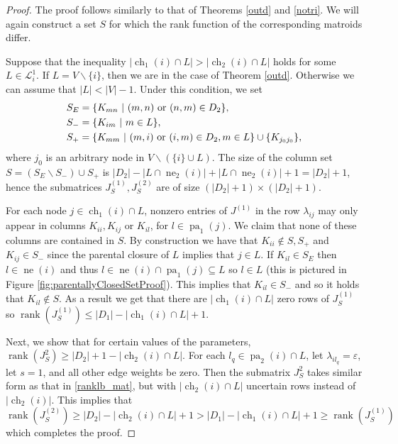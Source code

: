 \documentclass[12pt,reqno]{amsart}
\theoremstyle{plain}
\theoremstyle{definition}
\DeclareMathOperator{\pa}{pa}
\DeclareMathOperator{\ch}{ch}
\DeclareMathOperator{\rank}{rank}
\DeclareMathOperator{\neighbors}{ne}
\begin{document}
\begin{proof}
The proof follows similarly to that of Theorems \ref{outd} and \ref{notri}. We will again construct a set $S$ for which the rank function of the corresponding matroids differ. 

Suppose that the inequality $|\ch_{1}(i)\cap L|>|\ch_{2}(i)\cap L|$ holds for some $L\in\mathcal{L}_i^1$. If $L=V\backslash\{i\}$, then we are in the case of Theorem \ref{outd}. Otherwise we can assume that $|L|<|V|-1$. Under this condition, we set 
\begin{align*}
& S_E=\{K_{mn} ~|~ (m,n)\ {\rm or}\ (n,m) \in D_2\}, \\
&S_-=\{K_{im} ~|~ m\in L\}, \\
&S_+=\{K_{mm} ~|~  (m,i)\ {\rm or}\ (i,m)\in D_2, m\in L\}\cup\{K_{j_0j_0}\}, 
\end{align*}
where $j_0$ is an arbitrary node in $V\backslash(\{i\}\cup L)$. The size of the column set $S=(S_E\backslash S_-)\cup S_+$ is $|D_2|-|L\cap \neighbors_2(i)| + |L\cap \neighbors_2(i)| +1 = |D_2|+1$, hence the submatrices $J_S^{(1)},J_S^{(2)}$ are of size $(|D_2|+1)\times (|D_2|+1)$. 

For each node $j\in \ch_1(i)\cap L$, nonzero entries of $J^{(1)}$ in the row $\lambda_{ij}$ may only appear in columns $K_{ii}, K_{ij}$ or $K_{il}$, for $l \in \pa_1(j)$.  We claim that none of these columns are contained in $S$. By construction we have that $K_{ii} \notin S, S_+$ and $K_{ij} \in S_-$ since the parental closure of $L$ implies that $j \in L$. If $K_{il} \in S_E$  then $l \in \neighbors(i)$ and thus $l \in \neighbors(i) \cap \pa_1(j) \subseteq L$ so $l \in L$ (this is pictured in Figure \ref{fig:parentallyClosedSetProof}). This implies that $K_{il} \in S_-$ and so it holds that $K_{il} \notin S$. As a result we get that there are $|\ch_1(i) \cap L|$ zero rows of $J_S^{(1)}$ so $\rank(J_S^{(1)}) \leq |D_1| - |\ch_1(i) \cap L| + 1$. 

 


Next, we show that for certain values of the parameters, $\rank(J_S^2) \geq |D_2|+1-|\ch_2(i)\cap L|$. For each $l_q \in \pa_2(i) \cap L$, let $\lambda_{i l_q}= \varepsilon$, let $s=1$, and all other edge weights be zero. Then the submatrix $J_S^2$ takes similar form as that in \eqref{ranklb_mat}, but with $|\ch_2(i)\cap L|$ uncertain rows instead of $|\ch_2(i)|$. This implies that
\[
\rank(J_S^{(2)}) \geq |D_2| - |\ch_2(i) \cap L| + 1 > |D_1| - |\ch_1(i) \cap L| + 1 \geq \rank(J_S^{(1)})
\]
which completes the proof. 
\end{proof}
\end{document}
